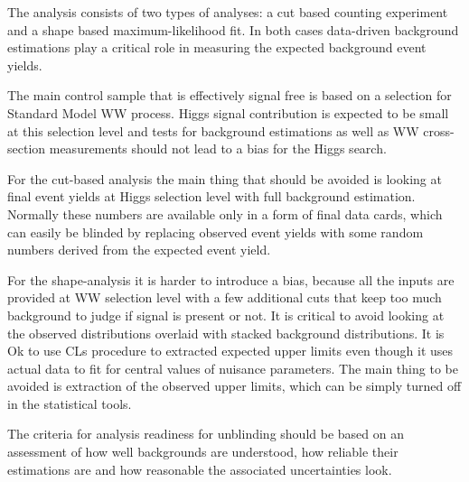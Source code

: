 The analysis consists of two types of analyses: a cut based counting
experiment and a shape based maximum-likelihood fit. In both cases
data-driven background estimations play a critical role in measuring
the expected background event yields.

The main control sample that is effectively signal free is based on a
selection for Standard Model WW process. Higgs signal contribution is
expected to be small at this selection level and tests for background
estimations as well as WW cross-section measurements should not lead
to a bias for the Higgs search.

For the cut-based analysis the main thing that should be avoided is
looking at final event yields at Higgs selection level with full
background estimation. Normally these numbers are available only in a
form of final data cards, which can easily be blinded by replacing
observed event yields with some random numbers derived from the
expected event yield.

For the shape-analysis it is harder to introduce a bias, because all
the inputs are provided at WW selection level with a few additional
cuts that keep too much background to judge if signal is present or
not. It is critical to avoid looking at the observed distributions
overlaid with stacked background distributions. It is Ok to use CLs
procedure to extracted expected upper limits even though it uses
actual data to fit for central values of nuisance parameters. The main
thing to be avoided is extraction of the observed upper limits, which
can be simply turned off in the statistical tools.

The criteria for analysis readiness for unblinding should be based on
an assessment of how well backgrounds are understood, how reliable their
estimations are and how reasonable the associated uncertainties look.
